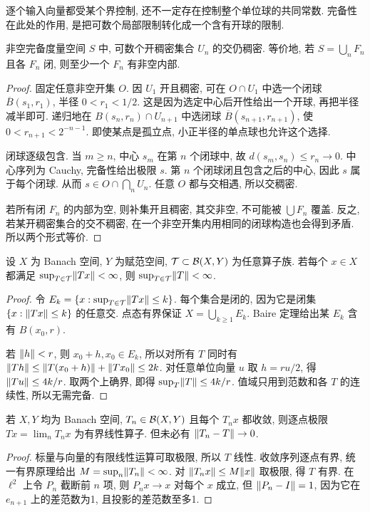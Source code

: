 \label{ch:baire}
逐个输入向量都受某个界控制, 还不一定存在控制整个单位球的共同常数. 完备性在此处的作用, 是把可数个局部限制转化成一个含有开球的限制.

\begin{theorem}\label{thm:baire}
非空完备度量空间 $S$ 中, 可数个开稠密集合 $U_n$ 的交仍稠密. 等价地, 若 $S=\bigcup_nF_n$ 且各 $F_n$ 闭, 则至少一个 $F_n$ 有非空内部.
\end{theorem}
\begin{proof}
固定任意非空开集 $O$. 因 $U_1$ 开且稠密, 可在 $O\cap U_1$ 中选一个闭球 $\overline B(s_1,r_1)$, 半径 $0<r_1<1/2$. 这是因为选定中心后开性给出一个开球, 再把半径减半即可. 递归地在 $B(s_n,r_n)\cap U_{n+1}$ 中选闭球 $\overline B(s_{n+1},r_{n+1})$, 使 $0<r_{n+1}<2^{-n-1}$. 即使某点是孤立点, 小正半径的单点球也允许这个选择.

闭球逐级包含. 当 $m\ge n$, 中心 $s_m$ 在第 $n$ 个闭球中, 故 $d(s_m,s_n)\le r_n\to0$. 中心序列为 Cauchy, 完备性给出极限 $s$. 第 $n$ 个闭球闭且包含之后的中心, 因此 $s$ 属于每个闭球. 从而 $s\in O\cap\bigcap_nU_n$. 任意 $O$ 都与交相遇, 所以交稠密.

若所有闭 $F_n$ 的内部为空, 则补集开且稠密, 其交非空, 不可能被 $\bigcup F_n$ 覆盖. 反之, 若某开稠密集合的交不稠密, 在一个非空开集内用相同的闭球构造也会得到矛盾. 所以两个形式等价.
\end{proof}

\begin{theorem}[统一有界原理]\label{thm:ub}
设 $X$ 为 Banach 空间, $Y$ 为赋范空间, $\mathcal T\subset\mathcal B(X,Y)$ 为任意算子族. 若每个 $x\in X$ 都满足 $\sup_{T\in\mathcal T}\lVert Tx\rVert<\infty$, 则 $\sup_{T\in\mathcal T}\lVert T\rVert<\infty$.
\end{theorem}
\begin{proof}
令 $E_k=\{x:\sup_{T\in\mathcal T}\lVert Tx\rVert\le k\}$. 每个集合是闭的, 因为它是闭集 $\{x:\lVert Tx\rVert\le k\}$ 的任意交. 点态有界保证 $X=\bigcup_{k\ge1}E_k$. Baire 定理给出某 $E_k$ 含有 $B(x_0,r)$.

若 $\lVert h\rVert<r$, 则 $x_0+h,x_0\in E_k$, 所以对所有 $T$ 同时有 $\lVert Th\rVert\le\lVert T(x_0+h)\rVert+\lVert Tx_0\rVert\le2k$. 对任意单位向量 $u$ 取 $h=ru/2$, 得 $\lVert Tu\rVert\le4k/r$. 取两个上确界, 即得 $\sup_T\lVert T\rVert\le4k/r$. 值域只用到范数和各 $T$ 的连续性, 所以无需完备.
\end{proof}

\begin{corollary}\label{cor:stronglimit}
若 $X,Y$ 均为 Banach 空间, $T_n\in\mathcal B(X,Y)$ 且每个 $T_nx$ 都收敛, 则逐点极限 $Tx=\lim_nT_nx$ 为有界线性算子. 但未必有 $\lVert T_n-T\rVert\to0$.
\end{corollary}
\begin{proof}
标量与向量的有限线性运算可取极限, 所以 $T$ 线性. 收敛序列逐点有界, 统一有界原理给出 $M=\sup_n\lVert T_n\rVert<\infty$. 对 $\lVert T_nx\rVert\le M\lVert x\rVert$ 取极限, 得 $T$ 有界. 在 $\ell^2$ 上令 $P_n$ 截断前 $n$ 项, 则 $P_nx\to x$ 对每个 $x$ 成立, 但 $\lVert P_n-I\rVert=1$, 因为它在 $e_{n+1}$ 上的差范数为1, 且投影的差范数至多1.
\end{proof}

